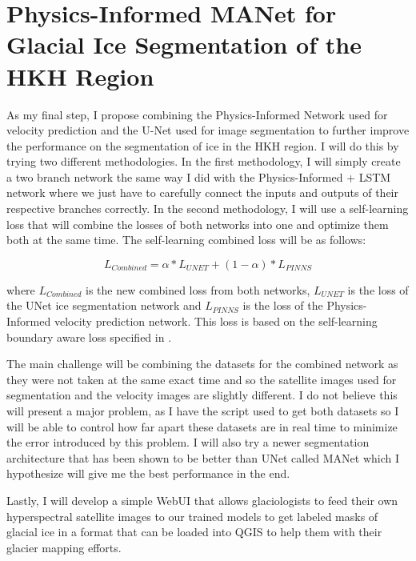 \chapter{Physics-Informed MANet for Glacial Ice Segmentation of the HKH Region}
As my final step, I propose combining the Physics-Informed Network used for velocity prediction and the U-Net used for image segmentation to further improve the performance on the segmentation of ice in the HKH region. I will do this by trying two different methodologies. In the first methodology, I will simply create a two branch network the same way I did with the Physics-Informed + LSTM network where we just have to carefully connect the inputs and outputs of their respective branches correctly. In the second methodology, I will use a self-learning loss that will combine the losses of both networks into one and optimize them both at the same time. The self-learning combined loss will be as follows:

\begin{equation} \label{eq:1}
    L_{Combined} = \alpha * L_{UNET} + (1 - \alpha) * L_{PINNS}
\end{equation}

where $L_{Combined}$ is the new combined loss from both networks, $L_{UNET}$ is the loss of the UNet ice segmentation network and $L_{PINNS}$ is the loss of the Physics-Informed velocity prediction network. This loss is based on the self-learning boundary aware loss specified in \cite{Bibek2023}.

The main challenge will be combining the datasets for the combined network as they were not taken at the same exact time and so the satellite images used for segmentation and the velocity images are slightly different. I do not believe this will present a major problem, as I have the script used to get both datasets so I will be able to control how far apart these datasets are in real time to minimize the error introduced by this problem. I will also try a newer segmentation architecture that has been shown to be better than UNet called MANet \cite{MANet} which I hypothesize will give me the best performance in the end.

Lastly, I will develop a simple WebUI that allows glaciologists to feed their own hyperspectral satellite images to our trained models to get labeled masks of glacial ice in a format that can be loaded into QGIS to help them with their glacier mapping efforts.